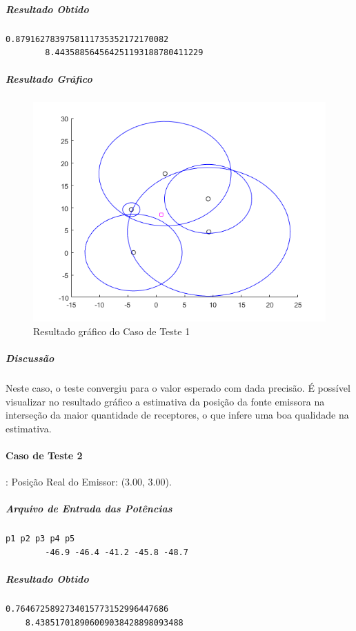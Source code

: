 	\subparagraph{Resultado Obtido}
	\begin{Verbatim}[fontsize=\footnotesize]
		0.8791627839758111735352172170082
		8.443588564564251193188780411229
	\end{Verbatim}

	\subparagraph{Resultado Gráfico}
	\begin{figure}[h]
		\centering
		\includegraphics[scale = 0.7]{ct_1}
		\caption{Resultado gráfico do Caso de Teste 1}
	\end{figure}

	\subparagraph{Discussão}
	Neste caso, o teste convergiu para o valor esperado com dada precisão. É possível
	visualizar no resultado gráfico a estimativa da posição da fonte emissora na interseção
	da maior quantidade de receptores, o que infere uma boa qualidade na estimativa.

	\paragraph{Caso de Teste 2}: Posição Real do Emissor: ($3.00$, $3.00$).
	\subparagraph{Arquivo de Entrada das Potências}
	\begin{Verbatim}[fontsize=\footnotesize]
		p1 p2 p3 p4 p5
		-46.9 -46.4 -41.2 -45.8 -48.7
	\end{Verbatim}

	\subparagraph{Resultado Obtido}
	\begin{Verbatim}[fontsize=\footnotesize]
		0.7646725892734015773152996447686
  	8.438517018906009038428898093488
	\end{Verbatim}


